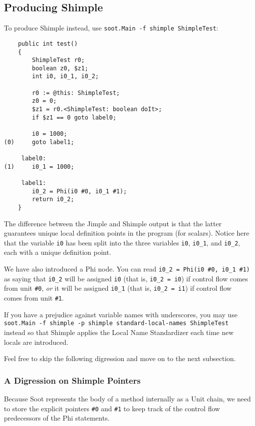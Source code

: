 \documentclass[10pt,letterpaper,oneside,onecolumn]{article}
\begin{document}
\subsection{Producing Shimple}

To produce Shimple instead, use {\tt soot.Main -f shimple ShimpleTest}:

\begin{verbatim}
    public int test()
    {
        ShimpleTest r0;
        boolean z0, $z1;
        int i0, i0_1, i0_2;

        r0 := @this: ShimpleTest;
        z0 = 0;
        $z1 = r0.<ShimpleTest: boolean doIt>;
        if $z1 == 0 goto label0;

        i0 = 1000;
(0)     goto label1;

     label0:
(1)     i0_1 = 1000;

     label1:
        i0_2 = Phi(i0 #0, i0_1 #1);
        return i0_2;
    }
\end{verbatim}

The difference between the Jimple and Shimple output is that the
latter guarantees unique local definition points in the program (for
scalars).  Notice here that the variable {\tt i0} has been split into
the three variables {\tt i0}, {\tt i0\_1}, and {\tt i0\_2}, each with a
unique definition point.

We have also introduced a Phi node.  You can read {\tt i0\_2 = Phi(i0
\#0, i0\_1 \#1)} as saying that {\tt i0\_2} will be assigned {\tt i0}
(that is, {\tt i0\_2 = i0}) if control flow comes from unit {\tt \#0},
{\em or} it will be assigned {\tt i0\_1} (that is, {\tt i0\_2 = i1})
if control flow comes from unit {\tt \#1}.

If you have a prejudice against variable names with underscores, you
may use {\tt soot.Main -f shimple -p shimple standard-local-names
ShimpleTest} instead so that Shimple applies the Local Name
Standardizer each time new locals are introduced.

Feel free to skip the following digression and move on to the next
subsection.

\subsubsection{A Digression on Shimple Pointers}

Because Soot represents the body of a method internally as a Unit
chain, we need to store the explicit pointers {\tt \#0} and {\tt \#1} to
keep track of the control flow predecessors of the Phi statements.
\end{document}
